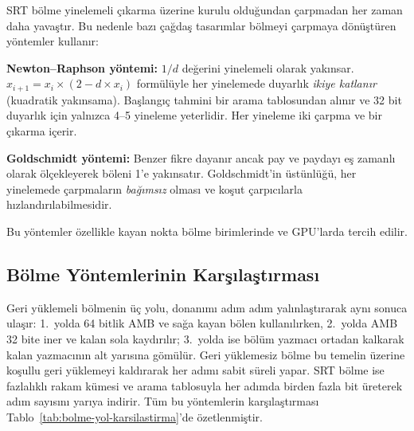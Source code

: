 \begin{bilginot}
SRT bölme yinelemeli çıkarma üzerine kurulu olduğundan çarpmadan her zaman daha yavaştır. Bu nedenle bazı çağdaş tasarımlar bölmeyi çarpmaya dönüştüren yöntemler kullanır:

\textbf{Newton--Raphson yöntemi:} $1/d$ değerini yinelemeli olarak yakınsar. $x_{i+1} = x_i \times (2 - d \times x_i)$ formülüyle her yinelemede duyarlık \emph{ikiye katlanır} (kuadratik yakınsama). Başlangıç tahmini bir arama tablosundan alınır ve 32 bit duyarlık için yalnızca 4--5 yineleme yeterlidir. Her yineleme iki çarpma ve bir çıkarma içerir.

\textbf{Goldschmidt yöntemi:} Benzer fikre dayanır ancak pay ve paydayı eş zamanlı olarak ölçekleyerek böleni 1'e yakınsatır. Goldschmidt'in üstünlüğü, her yinelemede çarpmaların \emph{bağımsız} olması ve koşut çarpıcılarla hızlandırılabilmesidir.

Bu yöntemler özellikle kayan nokta bölme birimlerinde ve GPU'larda tercih edilir.
\end{bilginot}

\subsection{Bölme Yöntemlerinin Karşılaştırması}

Geri yüklemeli bölmenin üç yolu, donanımı adım adım yalınlaştırarak aynı sonuca ulaşır: 1.\ yolda 64 bitlik AMB ve sağa kayan bölen kullanılırken, 2.\ yolda AMB 32 bite iner ve kalan sola kaydırılır; 3.\ yolda ise bölüm yazmacı ortadan kalkarak kalan yazmacının alt yarısına gömülür. Geri yüklemesiz bölme bu temelin üzerine koşullu geri yüklemeyi kaldırarak her adımı sabit süreli yapar. SRT bölme ise fazlalıklı rakam kümesi ve arama tablosuyla her adımda birden fazla bit üreterek adım sayısını yarıya indirir. Tüm bu yöntemlerin karşılaştırması Tablo~\ref{tab:bolme-yol-karsilastirma}'de özetlenmiştir.

